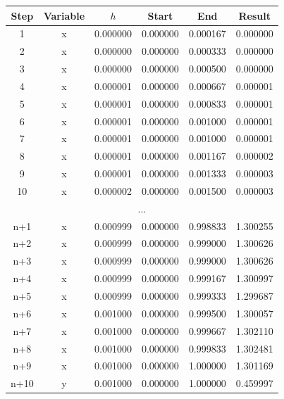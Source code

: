 \documentclass[12pt]{article}
\begin{document}
\begin{center}
	\begin{tabular}{ | c c c c c c | }
		\hline
		\hline
		Step & Variable & $h$ & Start & End & Result \\
		\hline
		\hline
		1    & x & 0.000000 & 0.000000 & 0.000167 & 0.000000 \\
		\hline
		2    & x & 0.000000 & 0.000000 & 0.000333 & 0.000000 \\
		\hline
		3    & x & 0.000000 & 0.000000 & 0.000500 & 0.000000 \\
		\hline
		4    & x & 0.000001 & 0.000000 & 0.000667 & 0.000001 \\
		\hline
		5    & x & 0.000001 & 0.000000 & 0.000833 & 0.000001 \\
		\hline
		6    & x & 0.000001 & 0.000000 & 0.001000 & 0.000001 \\
		\hline
		7    & x & 0.000001 & 0.000000 & 0.001000 & 0.000001 \\
		\hline
		8    & x & 0.000001 & 0.000000 & 0.001167 & 0.000002 \\
		\hline
		9    & x & 0.000001 & 0.000000 & 0.001333 & 0.000003 \\
		\hline
		10   & x & 0.000002 & 0.000000 & 0.001500 & 0.000003 \\
		\multicolumn{6}{|c|}{...} \\
		n+1  & x & 0.000999 & 0.000000 & 0.998833 & 1.300255 \\
		\hline
		n+2  & x & 0.000999 & 0.000000 & 0.999000 & 1.300626 \\
		\hline
		n+3  & x & 0.000999 & 0.000000 & 0.999000 & 1.300626 \\
		\hline
		n+4  & x & 0.000999 & 0.000000 & 0.999167 & 1.300997 \\
		\hline
		n+5  & x & 0.000999 & 0.000000 & 0.999333 & 1.299687 \\
		\hline
		n+6  & x & 0.001000 & 0.000000 & 0.999500 & 1.300057 \\
		\hline
		n+7  & x & 0.001000 & 0.000000 & 0.999667 & 1.302110 \\
		\hline
		n+8  & x & 0.001000 & 0.000000 & 0.999833 & 1.302481 \\
		\hline
		n+9  & x & 0.001000 & 0.000000 & 1.000000 & 1.301169 \\
		\hline
		n+10 & y & 0.001000 & 0.000000 & 1.000000 & 0.459997 \\
		\hline
		\hline
	\end{tabular}
\end{center}
\end{document}
